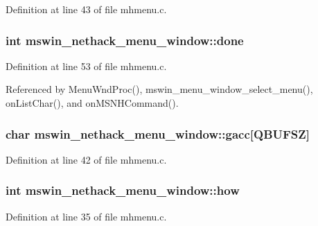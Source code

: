 Definition at line 43 of file mhmenu.\+c.

\hypertarget{structmswin__nethack__menu__window_aaeb9b85cb77679ee1b41ac2b0377d90b}{
\subsubsection[{done}]{\setlength{\rightskip}{0pt plus 5cm}int mswin\+\_\+nethack\+\_\+menu\+\_\+window\+::done}}\label{structmswin__nethack__menu__window_aaeb9b85cb77679ee1b41ac2b0377d90b}


Definition at line 53 of file mhmenu.\+c.



Referenced by Menu\+Wnd\+Proc(), mswin\+\_\+menu\+\_\+window\+\_\+select\+\_\+menu(), on\+List\+Char(), and on\+M\+S\+N\+H\+Command().

\hypertarget{structmswin__nethack__menu__window_a2cd3566e25e8ecfa1cd0fa3c79517a1d}{
\subsubsection[{gacc}]{\setlength{\rightskip}{0pt plus 5cm}char mswin\+\_\+nethack\+\_\+menu\+\_\+window\+::gacc\mbox{[}{\bf Q\+B\+U\+F\+S\+Z}\mbox{]}}}\label{structmswin__nethack__menu__window_a2cd3566e25e8ecfa1cd0fa3c79517a1d}


Definition at line 42 of file mhmenu.\+c.

\hypertarget{structmswin__nethack__menu__window_aa165ee77989c4e4cec77f8ce58ca27b9}{
\subsubsection[{how}]{\setlength{\rightskip}{0pt plus 5cm}int mswin\+\_\+nethack\+\_\+menu\+\_\+window\+::how}}\label{structmswin__nethack__menu__window_aa165ee77989c4e4cec77f8ce58ca27b9}


Definition at line 35 of file mhmenu.\+c.




